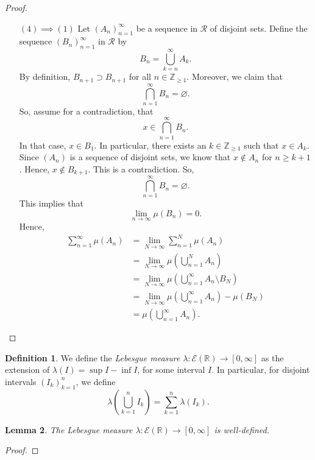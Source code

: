 \documentclass[a4paper, openany]{memoir}
\theoremstyle{definition}
\newtheorem{definition}{Definition}[section]
\theoremstyle{plain}
\newtheorem{lemma}[definition]{Lemma}
\begin{document}
\begin{proof}
\begin{itemize}
            \item[$(4) \implies (1)$] Let $(A_n)_{n=1}^\infty$ be a sequence in $\mathcal{R}$ of disjoint sets. Define the sequence $(B_n)_{n=1}^\infty$ in $\mathcal{R}$ by
            \[B_n = \bigcup_{k=n}^\infty A_k.\]
            By definition, $B_{n+1} \supset B_{n+1}$ for all $n \in \mathbb{Z}_{\geq 1}$. Moreover, we claim that
            \[\bigcap_{n=1}^\infty B_n = \varnothing.\]
            So, assume for a contradiction, that
            \[x \in \bigcap_{n=1}^\infty B_n.\]
            In that case, $x \in B_1$. In particular, there exists an $k \in \mathbb{Z}_{\geq 1}$ such that $x \in A_k$. Since $(A_n)$ is a sequence of disjoint sets, we know that $x \not\in A_n$ for $n \geq k+1$. Hence, $x \not\in B_{k+1}$. This is a contradiction. So, 
            \[\bigcap_{n=1}^\infty B_n = \varnothing.\]
            This implies that
            \[\lim_{n \to \infty} \mu(B_n) = 0.\]
            Hence,
            \begin{align*}
                \sum_{n=1}^\infty \mu(A_n) &= \lim_{N \to \infty} \sum_{n=1}^N \mu(A_n) \\
                &= \lim_{N \to \infty} \mu \left(\bigcup_{n=1}^N A_n\right) \\
                &= \lim_{N \to \infty} \mu \left(\bigcup_{n=1}^\infty A_n \setminus B_N\right) \\
                &= \lim_{N \to \infty} \mu \left(\bigcup_{n=1}^\infty A_n\right) - \mu(B_N) \\
                &= \mu \left(\bigcup_{n=1}^\infty A_n\right).
            \end{align*}
        \end{itemize}
    \end{proof}

    \begin{definition}
        We define the \emph{Lebesgue measure} $\lambda \colon \mathcal{E}(\mathbb{R}) \to [0, \infty]$ as the extension of $\lambda(I) = \sup I - \inf I$, for some interval $I$. In particular, for disjoint intervals $(I_k)_{k=1}^n$, we define
        \[\lambda \left(\bigcup_{k=1}^n I_k\right) = \sum_{k=1}^n \lambda (I_k).\]
    \end{definition}

    \begin{lemma}
        The Lebesgue measure $\lambda \colon \mathcal{E}(\mathbb{R}) \to [0, \infty]$ is well-defined.
    \end{lemma}
    \begin{proof}
    \end{proof}
\end{document}
